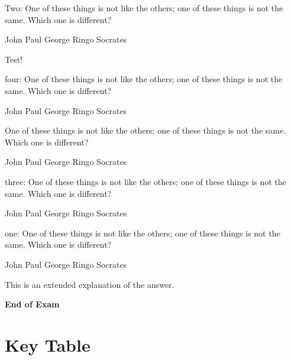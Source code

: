 \documentclass[]{exam}
\newcommand{\sol}[1]{{\ifprintanswers \color{red} #1 \fi}}
\begin{document}
\begin{questions}




\question
Two: One of these things is not like the others; one of these
things is not the same. Which one is different?

\begin{randomizechoices}
\choice John
\choice Paul
\choice George
\choice Ringo
\CorrectChoice Socrates
\end{randomizechoices}

\sol{Test!}

\question
four: One of these things is not like the others; one of these
things is not the same. Which one is different?

\begin{randomizechoices}
\choice John
\choice Paul
\choice George
\choice Ringo
\CorrectChoice Socrates
\end{randomizechoices}

\question
One of these things is not like the others; one of these
things is not the same. Which one is different?

\begin{randomizechoices}
\choice John
\choice Paul
\choice George
\choice Ringo
\CorrectChoice Socrates
\end{randomizechoices}

\question
three: One of these things is not like the others; one of these
things is not the same. Which one is different?

\begin{randomizechoices}
\choice John
\choice Paul
\choice George
\choice Ringo
\CorrectChoice Socrates
\end{randomizechoices}

\clearpage

\question
one: One of these things is not like the others; one of these
things is not the same. Which one is different?

\begin{randomizechoices}
\choice John
\choice Paul
\choice George
\choice Ringo
\CorrectChoice Socrates
\end{randomizechoices}
\sol{This is an extended explanation of the answer.}



\end{questions}


\vspace{5cm}
\Huge \begin{center} \textbf{End of Exam} \end{center}

\clearpage

\section*{Key Table}
\normalsize

\printkeytable[1-30]%

\writekeylist{\mykeylist}

\savekeylist[\yesthekeylist]

\end{document}
